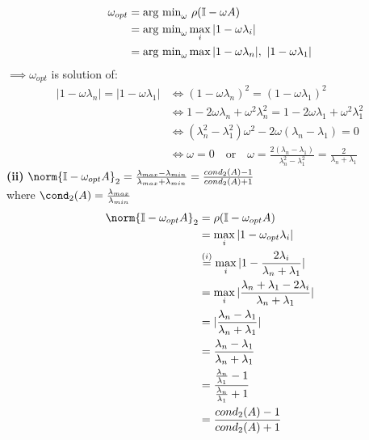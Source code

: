 \begin{SolutionSheet}[\ref{sheet6}]
\begin{onehalfspace}
\begin{Solution}
\begin{align*}
      \omega_{opt} &= \text{arg min}_{\omega} \ \rho(\I-\omega A) \\
      &= \text{arg min}_{\omega} \max_i |1-\omega\lambda_i| \\
      &= \text{arg min}_{\omega} \max{|1-\omega\lambda_n|, \ |1-\omega\lambda_1|}
    \end{align*}
    $\implies \omega_{opt}$ is solution of: \begin{align*}
      |1-\omega\lambda_n| = |1-\omega\lambda_1| & \iff (1-\omega\lambda_n)^2 = (1-\omega\lambda_1)^2 \\
      &\iff 1 - 2\omega\lambda_n + \omega^2 \lambda_n^2 = 1 - 2\omega\lambda_1 + \omega^2 \lambda_1^2 \\
      &\iff (\lambda_n^2 - \lambda_1^2) \omega^2 - 2 \omega(\lambda_n - \lambda_1) = 0 \\
    &\iff \omega=0 \quad \text{or} \quad \omega = \frac{2(\lambda_n - \lambda_1)}{\lambda_n^2 - \lambda_1^2} = \frac{2}{\lambda_n + \lambda_1}
    \end{align*}
    \textbf{(ii)} \Claim $\norm{\I - \omega_{opt}A}_2 = \frac{\lambda_{max} - \lambda_{min}}{\lambda_{max} + \lambda_{min}} = \frac{cond_2(A)-1}{cond_2(A)+1}$ \\
    where $\cond_2(A) = \frac{\lambda_{max}}{\lambda_{min}}$ \\
    \Proof \begin{align*}
      \norm{\I - \omega_{opt}A}_2 &= \rho(\I - \omega_{opt}A) \\
      &= \max_i |1-\omega_{opt}\lambda_i| \\
      &\stackrel{(i)}{=} \max_i |1-\frac{2\lambda_i}{\lambda_n + \lambda_1}| \\
      &= \max_i |\frac{\lambda_n + \lambda_1 - 2\lambda_i}{\lambda_n + \lambda_1}| \\
      &= |\frac{\lambda_n - \lambda_1}{\lambda_n + \lambda_1}| \\
      &= \frac{\lambda_n - \lambda_1}{\lambda_n + \lambda_1} \\
      &= \frac{\frac{\lambda_n}{\lambda_1} - 1}{\frac{\lambda_n}{\lambda_1} + 1} \\
      &= \frac{cond_2(A)-1}{cond_2(A)+1}
    \end{align*}
  \end{Solution}


\end{onehalfspace}
\end{SolutionSheet}
